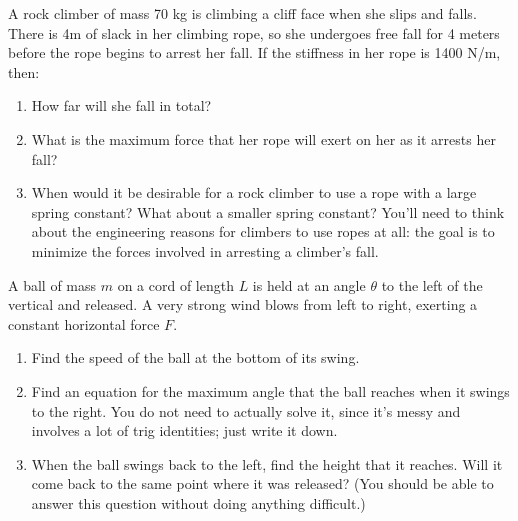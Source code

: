 \documentclass[12pt]{article}
\begin{document}
\Large
\centerline{}
\normalsize
\centerline{}


{A rock climber of mass 70 kg is climbing a cliff face when she slips and falls. There is 4m of slack in her climbing rope, so she undergoes free fall for 4 meters before the rope begins to arrest her fall. If the stiffness in her rope is 1400 N/m, then:}
  \begin{enumerate}
    \item{How far will she fall in total?}
\vspace{2in}

    \item{What is the maximum force that her rope will exert on her as it arrests her fall?}
\vspace{1.5in}

    \item When would it be desirable for a rock climber to use a rope with a large spring constant? What about a smaller spring constant? You'll need to think about 
          the engineering reasons for climbers to use ropes at all: the goal is to minimize the forces involved in arresting a climber's fall.
   \end{enumerate}

\newpage
%
%
%
%
 
 {A ball of mass $m$ on a cord of length $L$ is held at an angle $\theta$ to the left of the vertical and released. A very strong wind blows from left to right, exerting a constant horizontal force $F$. }

     \begin{enumerate}
       \item{Find the speed of the ball at the bottom of its swing.}
\vspace{2in}

       \item{Find an equation for the maximum angle that the ball reaches when it swings to the right. You do not need to actually solve it, since it's messy and involves a lot of trig identities; just write it down.}

\vspace{2in}

       \item{When the ball swings back to the left, find the height that it reaches. Will it come
         back to the same point where it was released? (You should be able to answer this question without doing anything difficult.)}
     \end{enumerate}
\end{document}
